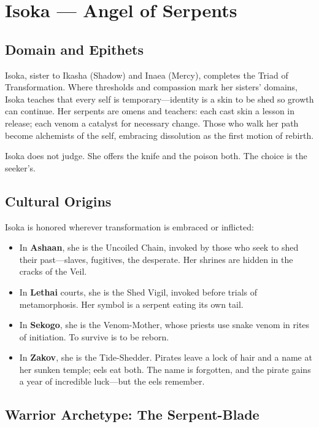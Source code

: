 \section{Isoka — Angel of Serpents}

\subsection{Domain and Epithets}

Isoka, sister to Ikasha (Shadow) and Inaea (Mercy), completes the Triad of Transformation. Where thresholds and compassion mark her sisters' domains, Isoka teaches that every self is temporary—identity is a skin to be shed so growth can continue. Her serpents are omens and teachers: each cast skin a lesson in release; each venom a catalyst for necessary change. Those who walk her path become alchemists of the self, embracing dissolution as the first motion of rebirth.

Isoka does not judge. She offers the knife and the poison both. The choice is the seeker's.

\subsection{Cultural Origins}

Isoka is honored wherever transformation is embraced or inflicted:

\begin{itemize}
\item In \textbf{Ashaan}, she is the Uncoiled Chain, invoked by those who seek to shed their past—slaves, fugitives, the desperate. Her shrines are hidden in the cracks of the Veil.
\item In \textbf{Lethai} courts, she is the Shed Vigil, invoked before trials of metamorphosis. Her symbol is a serpent eating its own tail.
\item In \textbf{Sekogo}, she is the Venom-Mother, whose priests use snake venom in rites of initiation. To survive is to be reborn.
\item In \textbf{Zakov}, she is the Tide-Shedder. Pirates leave a lock of hair and a name at her sunken temple; eels eat both. The name is forgotten, and the pirate gains a year of incredible luck—but the eels remember.
\end{itemize}

\subsection{Warrior Archetype: The Serpent-Blade}

